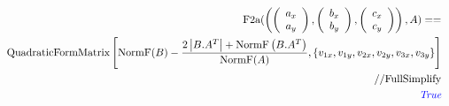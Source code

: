 \documentclass[8pt]{article}
\begin{document}
\begin{screen}
\begin{eqnarray*}
&& 
\text{F2a}(
\left(
\left( \begin{array}{c} a_{x} \\ a_{y} \end{array} \right),
\left( \begin{array}{c} b_{x} \\ b_{y} \end{array} \right),
\left( \begin{array}{c} c_{x} \\ c_{y} \end{array} \right)
\right), A
) == \\
 &&
\text{QuadraticFormMatrix}\left[
 \text{NormF}(B)- \frac{2 \left| B.A^T \right|
 +\text{NormF} \left(B.A^T\right)}{\text{NormF}(A)}
,\left\{v_{1 x},v_{1 y},v_{2 x},v_{2 y},v_{3 x},v_{3
  y}\right\}\right] \\
 && // \text{FullSimplify} \\
 && \text{\it \color{blue}True}
\end{eqnarray*}
\end{screen}
\end{document}

